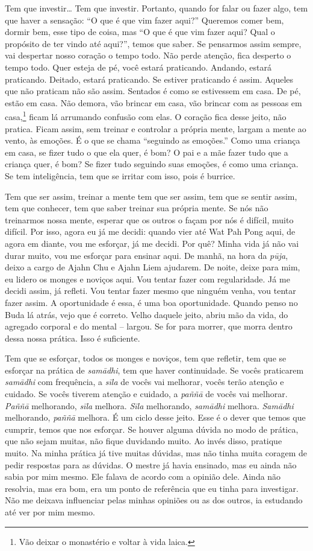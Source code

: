 Tem que investir\ldots{} Tem que investir. Portanto, quando for falar ou
fazer algo, tem que haver a sensação: “O que é que vim fazer aqui?”
Queremos comer bem, dormir bem, esse tipo de coisa, mas “O que é que
vim fazer aqui? Qual o propósito de ter vindo até aqui?”, temos que
saber. Se pensarmos assim sempre, vai despertar nosso coração o tempo
todo. Não perde atenção, fica desperto o tempo todo. Quer esteja de pé,
você estará praticando. Andando, estará praticando. Deitado, estará
praticando. Se estiver praticando é assim. Aqueles que não praticam não
são assim. Sentados é como se estivessem em casa. De pé, estão em casa.
Não demora, vão brincar em casa, vão brincar com as pessoas em
casa,\footnote{Vão deixar o monastério e voltar à vida laica.} ficam lá
arrumando confusão com elas. O coração fica desse jeito, não pratica.
Ficam assim, sem treinar e controlar a própria mente, largam a mente ao
vento, às emoções. É o que se chama “seguindo as emoções.” Como uma
criança em casa, se fizer tudo o que ela quer, é bom? O pai e a mãe
fazer tudo que a criança quer, é bom? Se fizer tudo seguindo suas
emoções, é como uma criança. Se tem inteligência, tem que se irritar
com isso, pois é burrice. 

Tem que ser assim, treinar a mente tem que ser assim, tem que se
sentir assim, tem que conhecer, tem que saber treinar sua própria
mente. Se nós não treinarmos nossa mente, esperar que os outros o façam
por nós é difícil, muito difícil. Por isso, agora eu já me decidi:
quando vier até Wat Pah Pong aqui, de agora em diante, vou me esforçar,
já me decidi. Por quê? Minha vida já não vai durar muito, vou me
esforçar para ensinar aqui. De manhã, na hora da \emph{pūja}, deixo
a cargo de Ajahn Chu e Ajahn Liem ajudarem. De noite, deixe para mim,
eu lidero os monges e noviços aqui. Vou tentar fazer com regularidade.
Já me decidi assim, já refleti. Vou tentar fazer mesmo que ninguém
venha, vou tentar fazer assim. A oportunidade é essa, é uma boa
oportunidade. Quando penso no Buda lá atrás, vejo que é correto. Velho
daquele jeito, abriu mão da vida, do agregado corporal e do mental –
largou. Se for para morrer, que morra dentro dessa nossa prática. Isso
é suficiente.

Tem que se esforçar, todos os monges e noviços, tem que refletir,
tem que se esforçar na prática de \emph{samādhi}, tem que haver
continuidade. Se vocês praticarem \emph{samādhi} com frequência, a
\emph{sīla} de vocês vai melhorar, vocês terão atenção e cuidado.
Se vocês tiverem atenção e cuidado, a \emph{paññā} de vocês vai
melhorar. \emph{Paññā} melhorando, \emph{sīla} melhora.
\emph{Sīla} melhorando, \emph{samādhi} melhora.
\emph{Samādhi} melhorando, \emph{paññā} melhora. É um ciclo
desse jeito. Esse é o dever que temos que cumprir, temos que nos
esforçar. Se houver alguma dúvida no modo de prática, que não sejam
muitas, não fique duvidando muito. Ao invés disso, pratique muito. Na
minha prática já tive muitas dúvidas, mas não tinha muita coragem de
pedir respostas para as dúvidas. O mestre já havia ensinado, mas eu
ainda não sabia por mim mesmo. Ele falava de acordo com a opinião dele.
Ainda não resolvia, mas era bom, era um ponto de referência que eu
tinha para investigar. Não me deixava influenciar pelas minhas opiniões
ou as dos outros, ia estudando até ver por mim mesmo.

